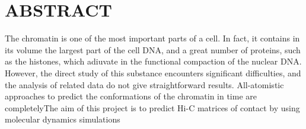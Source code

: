 \graphicspath{{images/}}
\newpage
\section{ABSTRACT}

The chromatin is one of the most important parts of a cell. In fact, it contains in its volume the largest part of the cell DNA, and a great number of proteins, such as the histones, which adiuvate in the functional compaction of the nuclear DNA. However, the direct study of this substance encounters significant difficulties, and the analysis of related data do not give straightforward results. All-atomistic approaches to predict the conformations of the chromatin in time are completelyThe aim of this project is to predict Hi-C matrices of contact by using molecular dynamics simulations
